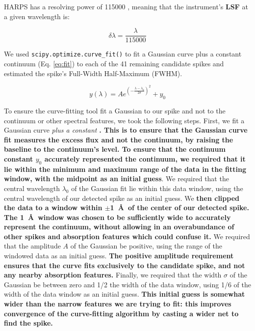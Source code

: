 \documentclass[linenumbers]{aastex701}
\providecommand{\DIFadd}[1]{{\bf #1}} %
\providecommand{\DIFaddbegin}{} %
\providecommand{\DIFaddend}{} %
\begin{document}
HARPS has a resolving power of 115000 \citep{HARPS_specs}, meaning that the instrument's  \DIFaddbegin \DIFadd{LSF }\DIFaddend at a given wavelength is: 

\begin{equation}
    \delta\lambda = \frac{\lambda}{115000}
     \DIFaddbegin \label{eq:LSF}
\DIFaddend \end{equation}

We used \texttt{scipy.optimize.curve\_fit()} \citep{2020SciPy-NMeth} to fit a Gaussian curve plus a constant continuum (Eq. \ref{eq:fit}) to each of the 41 remaining candidate spikes and estimated the spike's Full-Width Half-Maximum (FWHM). 

\begin{equation}
    y(\lambda) = A e^{\left(- \frac{\lambda - \lambda_0}{2 \sigma}\right)^2}+y_0
    \label{eq:fit}
\end{equation}

To ensure the curve-fitting tool fit a Gaussian to our spike and not to the continuum or other spectral features, we took the following steps.  First, we fit a Gaussian curve \emph{plus a constant} \DIFaddbegin \DIFadd{. This is to ensure that the Gaussian curve fit measures the excess flux and not the continuum, by raising the baseline to the continuum's level. To ensure that the continuum constant $y_0$ accurately represented the continuum, we required that it lie within the minimum and maximum range of the data in the fitting window, with the midpoint as an initial guess}\DIFaddend . We required that the central wavelength $\lambda_0$ of the Gaussian fit lie within this data window, using the central wavelength of our detected spike as an initial guess. We  \DIFaddbegin \DIFadd{then clipped the data to a window within $\pm$1~\AA~of the center of our detected spike. The 1~\AA~window was chosen to be sufficiently wide to accurately represent the continuum, without allowing in an overabundance of other spikes and absorption features which could confuse it. %
}\DIFaddend We required that the amplitude $A$ of the Gaussian be positive, using the range of the windowed data as an initial guess. \DIFaddbegin \DIFadd{The positive amplitude requirement ensures that the curve fits exclusively to the candidate spike, and not any nearby absorption features. }\DIFaddend Finally, we required that the width $\sigma$ of the Gaussian be between zero and 1/2 the width of the data window, using 1/6 of the width of the data window as an initial guess.  \DIFaddbegin \DIFadd{This initial guess is somewhat wider than the narrow features we are trying to fit: this improves convergence of the curve-fitting algorithm by casting a wider net to find the spike.
}\DIFaddend 
\end{document}
